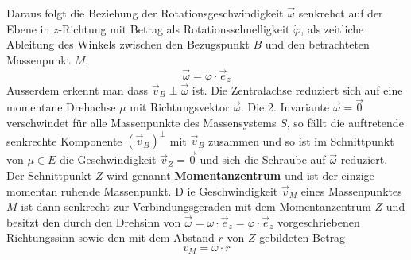 Daraus folgt die Beziehung der Rotationsgeschwindigkeit $\overrightarrow{\omega}$ senkrehct auf der Ebene in $z$-Richtung mit Betrag als Rotationsschnelligkeit $\dot{\varphi}$, als zeitliche Ableitung des Winkels zwischen den Bezugspunkt $B$ und den betrachteten Massenpunkt $M$. 
\begin{equation}
\boxed{\overrightarrow{\omega}=\dot{\varphi}\cdot \overrightarrow{e}_z}
\end{equation}
Ausserdem erkennt man dass $\overrightarrow{v}_B\perp \overrightarrow{\omega}$ ist. Die Zentralachse reduziert sich auf eine momentane Drehachse $\mu$ mit Richtungsvektor $\overrightarrow{\omega}$. Die 2. Invariante $\overrightarrow{\omega}=\overrightarrow{0}$ verschwindet für alle Massenpunkte des Massensystems $S$, so fällt die auftretende senkrechte Komponente $\left(\overrightarrow{v}_B\right)^{\perp}$ mit $\overrightarrow{v}_B$ zusammen und so ist im Schnittpunkt von $\mu\in E$ die Geschwindigkeit $\overrightarrow{v}_Z=\overrightarrow{0}$ und sich die Schraube auf $\overrightarrow{\omega}$ reduziert. Der Schnittpunkt $Z$ wird genannt \textbf{Momentanzentrum} und ist der einzige momentan ruhende Massenpunkt. 
\newline\newline D
ie Geschwindigkeit $\overrightarrow{v}_M$ eines Massenpunktes $M$ ist dann senkrecht zur Verbindungsgeraden mit dem Momentanzentrum $Z$ und besitzt den durch den Drehsinn von $\overrightarrow{\omega}=\omega\cdot \overrightarrow{e}_z=\dot{\varphi}\cdot \overrightarrow{e}_z$ vorgeschriebenen Richtungssinn sowie den mit dem Abstand $r$ von $Z$ gebildeten Betrag
\begin{equation}  
\boxed{v_M=\omega\cdot r}
\end{equation}  